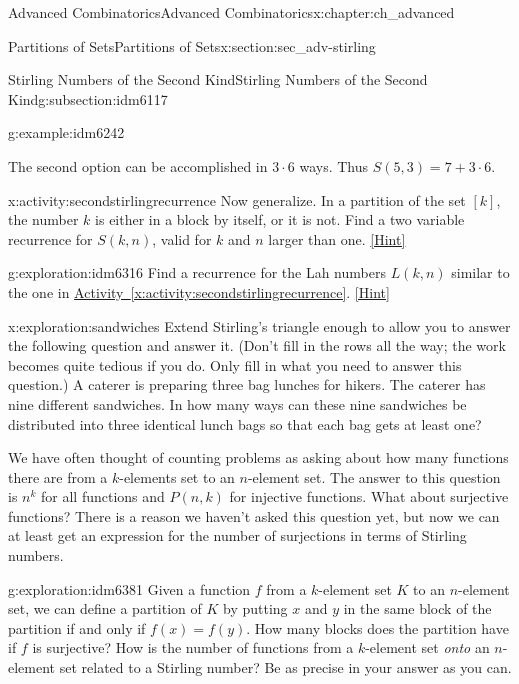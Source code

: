 \documentclass[oneside,10pt,]{book}
\numberwithin{equation}{chapter}
\begin{document}
\begin{chapterptx}{Advanced Combinatorics}{}{Advanced Combinatorics}{}{}{x:chapter:ch_advanced}
\begin{sectionptx}{Partitions of Sets}{}{Partitions of Sets}{}{}{x:section:sec_adv-stirling}
\begin{subsectionptx}{Stirling Numbers of the Second Kind}{}{Stirling Numbers of the Second Kind}{}{}{g:subsection:idm6117}
\begin{example}{}{g:example:idm6242}
\begin{enumerate}[label=\alph*.]
\end{enumerate}
The second option can be accomplished in \(3\cdot 6\) ways.  Thus \(S(5,3) = 7 + 3\cdot 6\).%
\end{example}
\begin{activity}{}{x:activity:secondstirlingrecurrence}%
Now generalize.  In a partition of the set \([k]\), the number \(k\) is either in a block by itself, or it is not.  Find a two variable recurrence for \(S(k,n)\), valid for \(k\) and \(n\) larger than one.%
\space\hspace*{0pt}\hfill{\tiny\hyperlink{g:hint:idm6286-back}{[Hint]}}\end{activity}
\begin{exploration}{}{g:exploration:idm6316}%
Find a recurrence for the Lah numbers \(L(k,n)\) similar to the one in \hyperref[x:activity:secondstirlingrecurrence]{Activity~\ref{x:activity:secondstirlingrecurrence}}.%
\space\hspace*{0pt}\hfill{\tiny\hyperlink{g:hint:idm6321-back}{[Hint]}}\end{exploration}
\begin{exploration}{}{x:exploration:sandwiches}%
Extend Stirling's triangle enough to allow you to answer the following question and answer it. (Don't fill in the rows all the way; the work becomes quite tedious if you do. Only fill in what you need to answer this question.) A caterer is preparing three bag lunches for hikers. The caterer has nine different sandwiches. In how many ways can these nine sandwiches be distributed into three identical lunch bags so that each bag gets at least one?%
\end{exploration}
We have often thought of counting problems as asking about how many functions there are from a \(k\)-elements set to an \(n\)-element set.  The answer to this question is \(n^k\) for all functions and \(P(n,k)\) for injective functions.  What about surjective functions?  There is a reason we haven't asked this question yet, but now we can at least get an expression for the number of surjections in terms of Stirling numbers.%
\begin{exploration}{}{g:exploration:idm6381}%
Given a function \(f\) from a \(k\)-element set \(K\) to an \(n\)-element set, we can define a partition of \(K\) by putting \(x\) and \(y\) in the same block of the partition if and only if \(f(x)=f(y)\). How many blocks does the partition have if \(f\) is surjective? How is the number of functions from a \(k\)-element set \emph{onto} an \(n\)-element set related to a Stirling number? Be as precise in your answer as you can.%

\end{exploration}
\end{subsectionptx}
\end{sectionptx}
\end{chapterptx}
\end{document}
